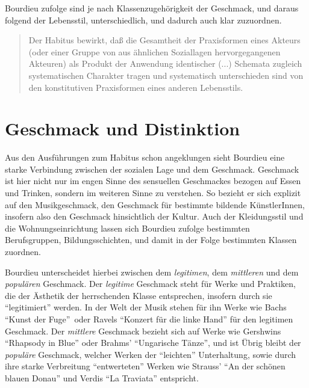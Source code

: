 \documentclass[a4paper, german, oneside]{scrbook}
\begin{document}
Bourdieu zufolge sind je nach Klassenzugehörigkeit der Geschmack, und daraus folgend der Lebensstil, unterschiedlich, und dadurch auch klar zuzuordnen. 

\blockquote[{\cite[278]{bourdieu_feinen_2012}}]{Der Habitus bewirkt, daß die Gesamtheit der Praxisformen eines Akteurs (oder einer Gruppe von aus ähnlichen Soziallagen hervorgegangenen Akteuren) als Produkt der Anwendung identischer (...) Schemata zugleich systematischen Charakter tragen und systematisch unterschieden sind von den konstitutiven Praxisformen eines anderen Lebensstils.}

\section{Geschmack und Distinktion}
Aus den Ausführungen zum Habitus schon angeklungen sieht Bourdieu eine starke Verbindung zwischen der sozialen Lage und dem Geschmack. Geschmack ist hier nicht nur im engen Sinne des sensuellen Geschmackes bezogen auf Essen und Trinken, sondern im weiteren Sinne zu verstehen. So bezieht er sich explizit auf den Musikgeschmack, den Geschmack für bestimmte bildende KünstlerInnen, insofern also den Geschmack hinsichtlich der Kultur. Auch der Kleidungsstil und die Wohnungseinrichtung lassen sich Bourdieu zufolge bestimmten Berufsgruppen, Bildungsschichten, und damit in der Folge bestimmten Klassen zuordnen. \parencite[vgl.][25]{bourdieu_feinen_2012}

Bourdieu unterscheidet hierbei zwischen dem \emph{legitimen}, dem \emph{mittleren} und dem \emph{populären} Geschmack. Der \emph{legitime} Geschmack steht für Werke und Praktiken, die der Ästhetik der herrschenden Klasse entsprechen, insofern durch sie \enquote{legitimiert} werden. \parencite[vgl.][551]{joas_sozialtheorie:_2004} In der Welt der Musik stehen für ihn Werke wie Bachs \enquote{Kunst der Fuge} oder Ravels \enquote{Konzert für die linke Hand} für den legitimen Geschmack. Der \emph{mittlere} Geschmack bezieht sich auf Werke wie Gershwins \enquote{Rhapsody in Blue} oder Brahms' \enquote{Ungarische Tänze}, und ist  Übrig bleibt der \emph{populäre} Geschmack, welcher Werken der \enquote{leichten} Unterhaltung, sowie durch ihre starke Verbreitung \enquote{entwerteten} Werken wie Strauss' \enquote{An der schönen blauen Donau} und Verdis \enquote{La Traviata} entspricht. \parencite[vgl.][38]{bourdieu_feinen_2012}
\end{document}
